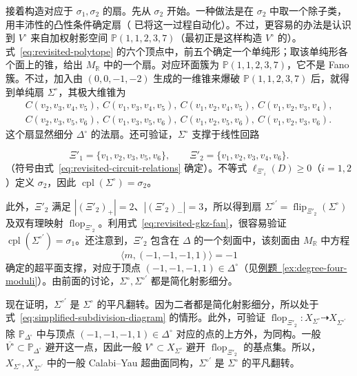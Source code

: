\begin{example}[重访]
接着构造对应于 $\sigma_1,\sigma_2$ 的扇。先从 $\sigma_2$ 开始。一种做法是在 $\sigma_2$ 中取一个除子类，用丰沛性的凸性条件确定扇（ 已将这一过程自动化）。不过，更容易的办法是认识到 $V^\circ$ 来自加权射影空间 $\mathbb P(1,1,2,3,7)$（最初正是这样构造 $V^\circ$ 的）。式~\eqref{eq:revisited-polytope} 的六个顶点中，前五个确定一个单纯形；取该单纯形各个面上的锥，给出
$M_{\mathbb R}$ 中的一个扇。对应环面簇为 $\mathbb P(1,1,2,3,7)$，它不是 Fano 簇。不过，加入由 $(0,0,-1,-2)$ 生成的一维锥来爆破 $\mathbb P(1,1,2,3,7)$ 后，就得到单纯扇 $\Sigma^\circ$，其极大维锥为
\[
\begin{gathered}
C(v_2,v_3,v_4,v_5),\ C(v_1,v_3,v_4,v_5),\ C(v_1,v_2,v_4,v_5),\ C(v_1,v_2,v_3,v_4),\\
C(v_2,v_3,v_5,v_6),\ C(v_1,v_3,v_5,v_6),\ C(v_1,v_2,v_5,v_6),\ C(v_1,v_2,v_3,v_6).
\end{gathered}
\]
这个扇显然细分 $\Delta^\circ$ 的法扇。还可验证，$\Sigma^\circ$ 支撑于线性回路

\[
\Xi'_1=\{v_1,v_2,v_3,v_5,v_6\},\qquad\Xi'_2=\{v_1,v_2,v_3,v_4,v_6\}.
\]
（符号由式~\eqref{eq:revisited-circuit-relations} 确定）。不等式 $\ell_{\Xi'_i}(D)\geq0$（$i=1,2$）定义 $\sigma_2$，因此 $\operatorname{cpl}(\Sigma^\circ)=\sigma_2$。

此外，$\Xi'_2$ 满足 $|(\Xi'_2)_+|=2$、$|(\Xi'_2)_-|=3$，所以得到扇 $\Sigma^{\circ\prime}=\operatorname{flip}_{\Xi'_2}(\Sigma^\circ)$ 及双有理映射 $\operatorname{flop}_{\Xi'_2}$。利用式~\eqref{eq:revisited-gkz-fan}，很容易验证 $\operatorname{cpl}(\Sigma^{\circ\prime})=\sigma_1$。还注意到，$\Xi'_2$ 包含在 $\Delta$ 的一个刻面中，该刻面由 $M_{\mathbb R}$ 中方程
\[
\langle m,(-1,-1,-1,1)\rangle=-1
\]
确定的超平面支撑，对应于顶点 $(-1,-1,-1,1)\in\Delta^\circ$（见\hyperref[ex:degree-four-moduli]{例题~\ref*{ex:degree-four-moduli}}）。由前面的讨论，$\Sigma^\circ,\Sigma^{\circ\prime}$ 都是简化射影细分。

现在证明，$\Sigma^{\circ\prime}$ 是 $\Sigma^\circ$ 的平凡翻转。因为二者都是简化射影细分，所以处于式~\eqref{eq:simplified-subdivision-diagram} 的情形。此外，可验证
$\operatorname{flop}_{\Xi'_2}:X_{\Sigma^\circ}\dashrightarrow X_{\Sigma^{\circ\prime}}$
除 $\mathbb P_{\Delta^\circ}$ 中与顶点 $(-1,-1,-1,1)\in\Delta^\circ$ 对应的点的上方外，为同构。一般 $\overline{V^\circ}\subset\mathbb P_{\Delta^\circ}$ 避开这一点，因此一般 $V^\circ\subset X_{\Sigma^\circ}$ 避开 $\operatorname{flop}_{\Xi'_2}$ 的基点集。所以，$X_{\Sigma^\circ},X_{\Sigma^{\circ\prime}}$ 中的一般 Calabi--Yau 超曲面同构，$\Sigma^{\circ\prime}$ 是 $\Sigma^\circ$ 的平凡翻转。


\end{example}
